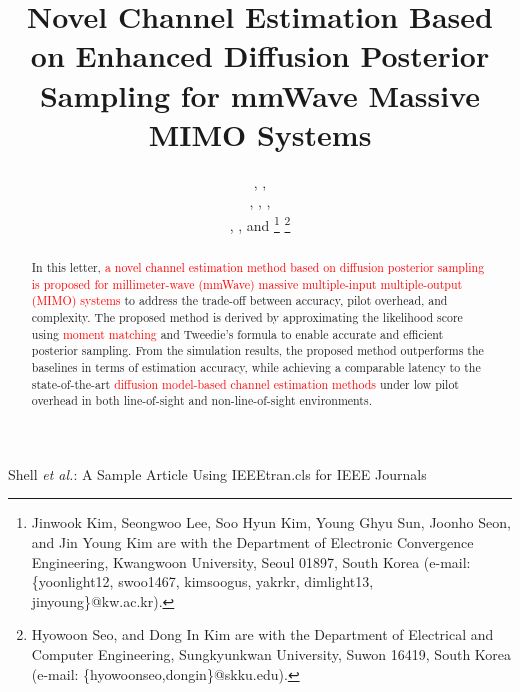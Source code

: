 \documentclass[lettersize,journal]{IEEEtran}
\newcommand{\tred}{\textcolor{red}}
\begin{document}
\title{Novel Channel Estimation Based on Enhanced Diffusion Posterior Sampling for mmWave Massive MIMO Systems}

\author{,  ,

, ,
,

, , and 
\thanks{Jinwook Kim, Seongwoo Lee, Soo Hyun Kim, Young Ghyu Sun, Joonho Seon, and Jin Young Kim are with the Department of Electronic Convergence Engineering, Kwangwoon University, Seoul 01897, South Korea (e-mail: \{yoonlight12, swoo1467, kimsoogus, yakrkr, dimlight13, jinyoung\}@kw.ac.kr).}
\thanks{Hyowoon Seo, and Dong In Kim are with the Department of Electrical and Computer Engineering, Sungkyunkwan University, Suwon 16419, South Korea (e-mail: \{hyowoonseo,dongin\}@skku.edu).}}


%
{Shell \MakeLowercase{\textit{et al.}}: A Sample Article Using IEEEtran.cls for IEEE Journals}

\maketitle
\begin{abstract}
In this letter, \tred{a novel channel estimation method based on diffusion posterior sampling is proposed for millimeter-wave (mmWave) massive multiple-input multiple-output (MIMO) systems} to address the trade-off between accuracy, pilot overhead, and complexity. The proposed method is derived by approximating the likelihood score using \tred{moment matching} and Tweedie's formula to enable accurate and efficient posterior sampling. From the simulation results, the proposed method outperforms the baselines in terms of estimation accuracy, while achieving a comparable latency to the state-of-the-art \tred{diffusion model-based channel estimation methods} under low pilot overhead in both line-of-sight and non-line-of-sight environments.
\end{abstract}
\end{document}

